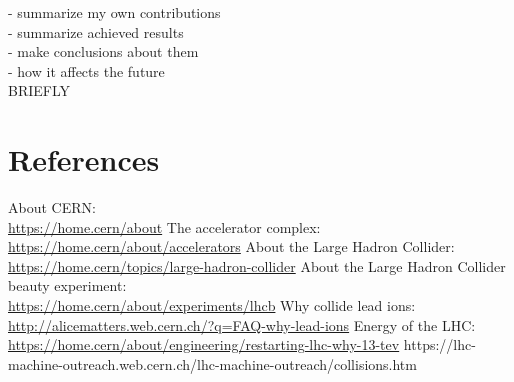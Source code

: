 \documentclass[12pt]{article}
\begin{document}
\color{red}
- summarize my own contributions \\
- summarize achieved results \\
- make conclusions about them \\
- how it affects the future \\
BRIEFLY
\color{black}


\section{References}

\begin{thebibliography}{asd}
	 About CERN: \\
		\url{https://home.cern/about}
	 The accelerator complex: \\
		\url{https://home.cern/about/accelerators}
	 About the Large Hadron Collider: \\
		\url{https://home.cern/topics/large-hadron-collider}
	 About the Large Hadron Collider beauty experiment: \\
		\url{https://home.cern/about/experiments/lhcb}
	 Why collide lead ions: \\
		\url{http://alicematters.web.cern.ch/?q=FAQ-why-lead-ions}
	 Energy of the LHC: \\
		\url{https://home.cern/about/engineering/restarting-lhc-why-13-tev}
	 https://lhc-machine-outreach.web.cern.ch/lhc-machine-outreach/collisions.htm
\end{thebibliography}
\end{document}
